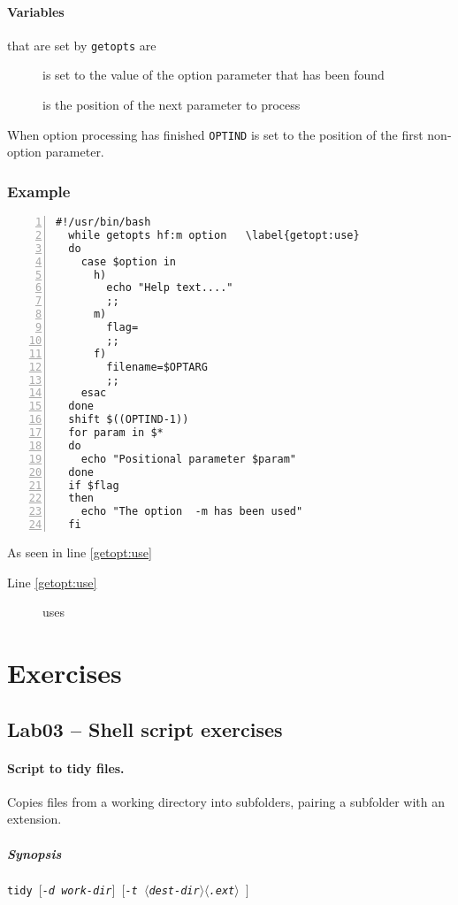 \documentclass[12pt,a4paper]{article}
\newcommand{\required}[1]{$\langle$\itshape #1$\rangle$}
\newcommand{\optional}[1]{$[$\itshape #1$]$}
\begin{document}
\paragraph{Variables} that are set by \texttt{getopts} are
\begin{description}
  \item[] is set to the value of the option parameter that has been found
\item[] is the position of the next parameter to process
\end{description}
When option processing has finished \texttt{OPTIND} is set to the position of the first non-option parameter.

\subsubsection{Example}
\begin{Verbatim}[numbers=left,gobble=2,commandchars=\\\{\}]
  #!/usr/bin/bash
  while getopts hf:m option   \label{getopt:use}
  do
    case $option in
      h)
        echo "Help text...."
        ;;
      m)
        flag=
        ;;
      f)
        filename=$OPTARG
        ;;
    esac
  done
  shift $((OPTIND-1))
  for param in $*
  do
    echo "Positional parameter $param"
  done
  if $flag
  then
    echo "The option  -m has been used"
  fi
\end{Verbatim}

As seen in line \ref{getopt:use}
\begin{description}
  \item[Line \ref{getopt:use}] uses
\end{description}

\section{Exercises}
\subsection{Lab03 -- Shell script exercises}
\paragraph{Script to tidy files.}  Copies files from a working directory into subfolders, pairing a subfolder with an extension.
\subparagraph{Synopsis} \texttt{tidy \optional{-d work-dir} \optional{-t \required{dest-dir}\required{.ext} }}
\end{document}
